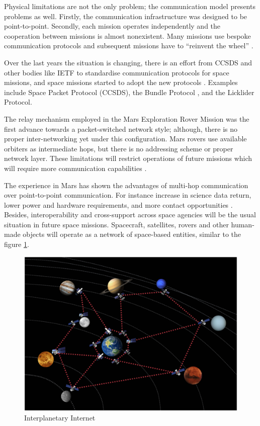 Physical limitations are not the only problem; the communication model presents problems as well. Firstly,  the communication infrastructure was designed to be point-to-point. Secondly, each mission operates independently and the cooperation between missions is almost nonexistent. Many missions use bespoke communication protocols and subsequent missions have to ``reinvent the wheel'' \cite{burleigh2003interplanetary}. 

Over the last years the situation is changing, there is an effort from CCSDS and other bodies like IETF to standardise communication protocols for space missions, and space missions started to adopt the new protocols \cite{weber2006transforming}. Examples include Space Packet Protocol (CCSDS), the Bundle Protocol \cite{standard2010ccsds}, and the Licklider Protocol\cite{birrane-dtn-adm-ltp-00}.  %

The relay mechanism employed in the Mars Exploration Rover Mission was the first advance towards a packet-switched network style; although, there is no proper inter-networking yet under this configuration. Mars rovers use available orbiters as intermediate hops, but there is no addressing scheme or proper network layer. These limitations will restrict operations of future missions which will require more communication capabilities \cite{rationale2010requirements}. 


The experience in Mars has shown the advantages of multi-hop communication over point-to-point communication. For instance increase in science data return, lower power and hardware requirements, and more contact opportunities \cite{rationale2010requirements}.  Besides, interoperability and cross-support across space agencies will be the usual situation in future space missions. Spacecraft, satellites, rovers and other human-made objects will operate as a network of space-based entities, similar to the figure \ref{fig:inter-internet}. 



\begin{figure}[ht]
\centering
\includegraphics[width=1 \linewidth]{images/interplanetary.png} 
\caption{Interplanetary Internet}
\label{fig:inter-internet}
\end{figure}


